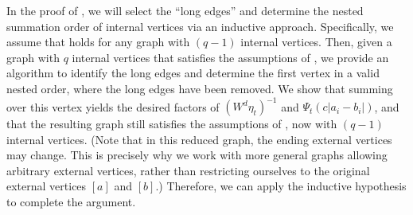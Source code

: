 

In the proof of , we will select the ``long edges'' and determine the nested summation order of internal vertices via an inductive approach. 
Specifically, we assume that  holds for any graph with $(q-1)$ internal vertices. Then, given a graph with $q$ internal vertices that satisfies the assumptions of , we provide an algorithm to identify the long edges and determine the first vertex in a valid nested order, where the long edges have been removed.
We show that summing over this vertex yields the desired factors of $(W^d\eta_t)^{-1}$ and $\Psi_t(c|a_i-b_i|)$, and that the resulting graph still satisfies the assumptions of , now with $(q-1)$ internal vertices. (Note that in this reduced graph, the ending external vertices may change. This is precisely why we work with more general graphs allowing arbitrary external vertices, rather than restricting ourselves to the original external vertices $[a]$ and $[b]$.) Therefore, we can apply the inductive hypothesis to complete the argument.



